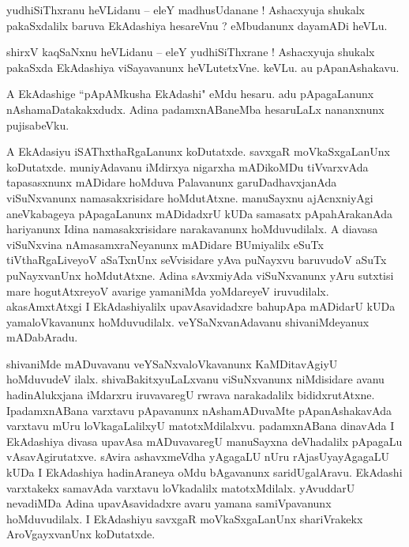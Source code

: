 \documentclass{article}
\begin{document}

\begin{mn}%
yudhiSiThxranu heVLidanu -- eleY madhusUdanane ! Ashacxyuja shukalx pakaSxdalilx baruva EkAdashiya 
hesareVnu ? eMbudanunx dayamADi heVLu.
\end{mn}

\begin{mn}%
shirxV kaqSaNxnu heVLidanu -- eleY yudhiSiThxrane ! Ashacxyuja shukalx pakaSxda EkAdashiya 
viSayavanunx heVLutetxVne. keVLu. au pApanAshakavu.
\end{mn}

\begin{mn}%
A EkAdashige ``pApAMkusha EkAdashi" eMdu hesaru. adu pApagaLanunx nAshamaDatakakxdudx. Adina 
padamxnABaneMba hesaruLaLx nananxnunx pujisabeVku.
\end{mn}

\begin{mn}%
A EkAdasiyu iSAThxthaRgaLanunx koDutatxde. savxgaR moVkaSxgaLanUnx koDutatxde. muniyAdavanu 
iMdirxya nigarxha mADikoMDu tiVvarxvAda tapasasxnunx mADidare hoMduva Palavanunx garuDadhavxjanAda 
viSuNxvanunx namasakxrisidare hoMdutAtxne. manuSayxnu ajAcnxniyAgi aneVkabageya pApagaLanunx 
mADidadxrU kUDa samasatx pApahArakanAda hariyanunx Idina namasakxrisidare narakavanunx 
hoMduvudilalx. A diavasa viSuNxvina nAmasamxraNeyanunx mADidare BUmiyalilx eSuTx tiVthaRgaLiveyoV 
aSaTxnUnx seVvisidare yAva puNayxvu baruvudoV aSuTx puNayxvanUnx hoMdutAtxne. Adina sAvxmiyAda 
viSuNxvanunx yAru sutxtisi mare hogutAtxreyoV avarige yamaniMda yoMdareyeV iruvudilalx. 
akasAmxtAtxgi I EkAdashiyalilx upavAsavidadxre bahupApa mADidarU kUDa yamaloVkavanunx 
hoMduvudilalx. veYSaNxvanAdavanu shivaniMdeyanux mADabAradu.
\end{mn}

\begin{mn}%
shivaniMde mADuvavanu veYSaNxvaloVkavanunx KaMDitavAgiyU hoMduvudeV ilalx. shivaBakitxyuLaLxvanu 
viSuNxvanunx niMdisidare avanu hadinAlukxjana iMdarxru iruvavaregU rwrava narakadalilx 
bididxrutAtxne. IpadamxnABana varxtavu pApavanunx nAshamADuvaMte pApanAshakavAda varxtavu mUru 
loVkagaLalilxyU matotxMdilalxvu. padamxnABana dinavAda I EkAdashiya divasa upavAsa mADuvavaregU 
manuSayxna deVhadalilx pApagaLu vAsavAgirutatxve. sAvira ashavxmeVdha yAgagaLU nUru 
rAjasUyayAgagaLU kUDa I EkAdashiya hadinAraneya oMdu bAgavanunx saridUgalAravu. EkAdashi 
varxtakekx samavAda varxtavu loVkadalilx matotxMdilalx. yAvuddarU nevadiMDa Adina upavAsavidadxre 
avaru yamana samiVpavanunx hoMduvudilalx. I EkAdashiyu savxgaR moVkaSxgaLanUnx shariVrakekx 
AroVgayxvanUnx koDutatxde.
\end{mn}
\end{document}
